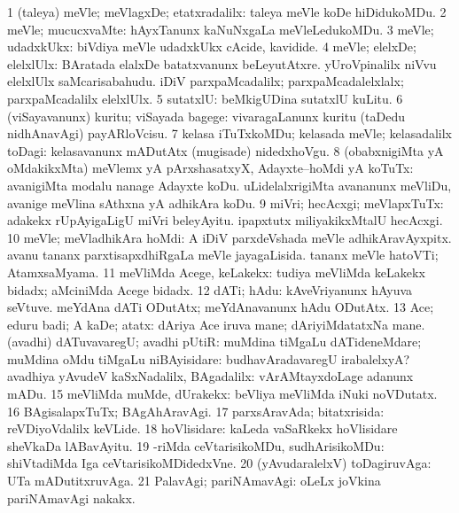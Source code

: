 \bentry
{}
\gl{\upa}
\bmng
\bnum
\num{1} (taleya) meVle; meVlagxDe; etatxradalilx:  taleya meVle koDe hiDidukoMDu. 
\num{2} meVle; mucucxvaMte:  hAyxTanunx kaNuNxgaLa meVleLedukoMDu. 
\num{3} meVle; udadxkUkx:  biVdiya meVle udadxkUkx cAcide, kavidide. 
\num{4} meVle; elelxDe; elelxlUlx:  BAratada elalxDe batatxvanunx beLeyutAtxre.  yUroVpinalilx niVvu elelxlUlx saMcarisabahudu.  iDiV parxpaMcadalilx; parxpaMcadalelxlalx; parxpaMcadalilx elelxlUlx. 
\num{5} sutatxlU:  beMkigUDina sutatxlU kuLitu. 
\num{6} (viSayavanunx) kuritu; viSayada bagege:  vivaragaLanunx kuritu (taDedu nidhAnavAgi) payARloVcisu. 
\num{7} kelasa iTuTxkoMDu; kelasada meVle; kelasadalilx toDagi:  kelasavanunx mADutAtx (mugisade) nidedxhoVgu. 
\num{8} (obabxnigiMta yA oMdakikxMta) meVlemx yA pArxshasatxyX, Adayxte--hoMdi yA koTuTx:  avanigiMta modalu nanage Adayxte koDu.  uLidelalxrigiMta avananunx meVliDu, avanige meVlina sAthxna yA adhikAra koDu. 
\num{9} miVri; hecAcxgi; meVlapxTuTx:  adakekx  rUpAyigaLigU miVri beleyAyitu.  ipapxtutx miliyakikxMtalU hecAcxgi. 
\num{10} meVle; meVladhikAra hoMdi:  A iDiV parxdeVshada meVle adhikAravAyxpitx.  avanu tananx parxtisapxdhiRgaLa meVle jayagaLisida.  tananx meVle hatoVTi; AtamxsaMyama. 
\num{11} meVliMda Acege, keLakekx:  tudiya meVliMda keLakekx bidadx; aMciniMda Acege bidadx. 
\num{12} dATi; hAdu:  kAveVriyanunx hAyuva seVtuve.  meYdAna dATi ODutAtx; meYdAnavanunx hAdu ODutAtx. 
\num{13} Ace; eduru badi; A kaDe; atatx:  dAriya Ace iruva mane; dAriyiMdatatxNa mane. 
\banum
{} (avadhi) dATuvavaregU; avadhi pUtiR:  muMdina tiMgaLu dATideneMdare; muMdina oMdu tiMgaLu niBAyisidare:  budhavAradavaregU irabalelxyA? 
 avadhiya yAvudeV kaSxNadalilx, BAgadalilx:  vArAMtayxdoLage adanunx mADu. 
\eanum
\numie
\num{15} meVliMda muMde, dUrakekx:  beVliya meVliMda iNuki noVDutatx. 
\num{16} BAgisalapxTuTx; BAgAhAravAgi. 
\num{17} parxsAravAda; bitatxrisida:  reVDiyoVdalilx keVLide. 
\num{18} hoVlisidare:    kaLeda vaSaRkekx hoVlisidare sheVkaDa  lABavAyitu. 
\num{19} -riMda ceVtarisikoMDu, sudhArisikoMDu:  shiVtadiMda Iga ceVtarisikoMDidedxVne. 
\num{20} (yAvudaralelxV) toDagiruvAga:  UTa mADutitxruvAga. 
\num{21} PalavAgi; pariNAmavAgi:  oLeLx joVkina pariNAmavAgi nakakx. 
\enum
\emng

